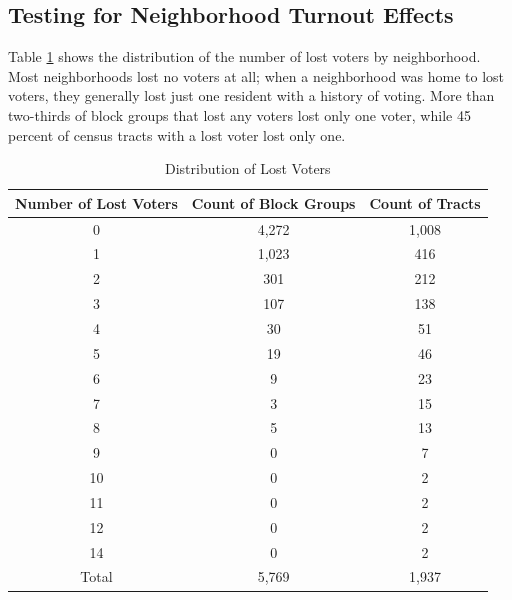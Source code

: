 \documentclass[
  12pt,
]{article}
\begin{document}
\hypertarget{testing-for-neighborhood-turnout-effects}{%
\subsection*{Testing for Neighborhood Turnout Effects}\label{testing-for-neighborhood-turnout-effects}}

Table \ref{tab:nhood-dist} shows the distribution of the number of lost voters by neighborhood. Most neighborhoods lost no voters at all; when a neighborhood was home to lost voters, they generally lost just one resident with a history of voting. More than two-thirds of block groups that lost any voters lost only one voter, while 45 percent of census tracts with a lost voter lost only one.

\begin{table}[H]

\caption{\label{tab:distribution-lost}\label{tab:nhood-dist} Distribution of Lost Voters}
\centering
\fontsize{10}{12}\selectfont
\begin{tabular}[t]{ccc}
\toprule
Number of Lost Voters & Count of Block Groups & Count of Tracts\\
\midrule
0 & 4,272 & 1,008\\
1 & 1,023 & 416\\
2 & 301 & 212\\
3 & 107 & 138\\
4 & 30 & 51\\
5 & 19 & 46\\
6 & 9 & 23\\
7 & 3 & 15\\
8 & 5 & 13\\
9 & 0 & 7\\
10 & 0 & 2\\
11 & 0 & 2\\
12 & 0 & 2\\
14 & 0 & 2\\
\hline
Total & 5,769 & 1,937\\
\bottomrule
\end{tabular}
\end{table}
\end{document}
